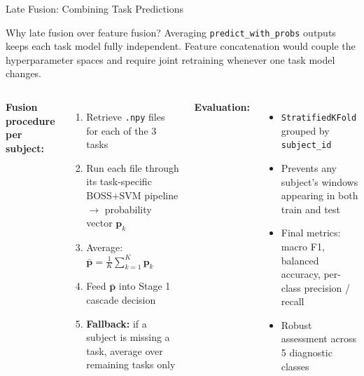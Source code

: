 \documentclass[aspectratio=169, 11pt]{beamer}
\begin{document}
\begin{frame}{Late Fusion: Combining Task Predictions}
  \begin{exampleblock}{Why late fusion over feature fusion?}
    \small
    Averaging \texttt{predict\_with\_probs} outputs keeps each task model
    fully independent. Feature concatenation would couple the
    hyperparameter spaces and require joint retraining whenever
    one task model changes.
  \end{exampleblock}

  \vspace{0.4em}
  \begin{columns}[T]
      \small
      \textbf{Fusion procedure per subject:}
      \begin{enumerate}
        \item Retrieve \texttt{.npy} files for each of the 3 tasks
        \item Run each file through its task-specific BOSS+SVM
              pipeline $\rightarrow$ probability vector $\mathbf{p}_k$
        \item Average: $\bar{\mathbf{p}} = \frac{1}{K}\sum_{k=1}^{K}\mathbf{p}_k$
        \item Feed $\bar{\mathbf{p}}$ into Stage 1 cascade decision
        \item \textbf{Fallback:} if a subject is missing a task,
              average over remaining tasks only
      \end{enumerate}
      \small
      \textbf{Evaluation:}
      \begin{itemize}
        \item \texttt{StratifiedKFold} grouped by \texttt{subject\_id}
        \item Prevents any subject's windows appearing in both
              train and test
        \item Final metrics: macro F1, balanced accuracy,
              per-class precision / recall
        \item Robust assessment across 5 diagnostic classes
      \end{itemize}
  \end{columns}
\end{frame}
\end{document}
